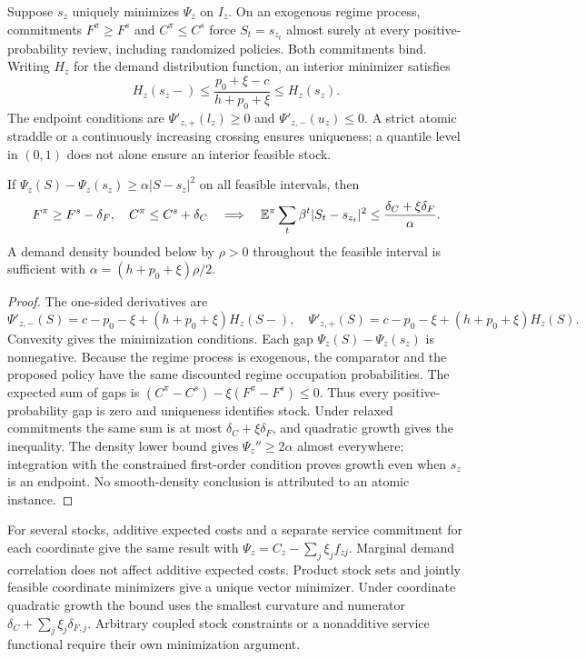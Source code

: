 \documentclass[11pt,letterpaper]{article}
\theoremstyle{definition}\newtheorem{remark}[theorem]{Remark}
\begin{document}
\begin{proposition}\label{ecprop:stock}
Suppose $s_z$ uniquely minimizes $\Psi_z$ on $I_z$. On an exogenous regime process, commitments $F^\pi\geq F^s$ and $C^\pi\leq C^s$ force $S_t=s_{z_t}$ almost surely at every positive-probability review, including randomized policies. Both commitments bind. Writing $H_z$ for the demand distribution function, an interior minimizer satisfies
\[
 H_z(s_z-)\leq\frac{p_0+\xi-c}{h+p_0+\xi}\leq H_z(s_z).
\]
The endpoint conditions are $\Psi'_{z,+}(l_z)\geq0$ and $\Psi'_{z,-}(u_z)\leq0$. A strict atomic straddle or a continuously increasing crossing ensures uniqueness; a quantile level in $(0,1)$ does not alone ensure an interior feasible stock.

If $\Psi_z(S)-\Psi_z(s_z)\geq\alpha|S-s_z|^2$ on all feasible intervals, then
\[
 F^\pi\geq F^s-\delta_F,\quad C^\pi\leq C^s+\delta_C
 \quad\Longrightarrow\quad
 \mathbb E^\pi\sum_t\beta^t|S_t-s_{z_t}|^2\leq\frac{\delta_C+\xi\delta_F}{\alpha}.
\]
A demand density bounded below by $\rho>0$ throughout the feasible interval is sufficient with $\alpha=(h+p_0+\xi)\rho/2$.
\end{proposition}
\begin{proof}
The one-sided derivatives are
\[
 \Psi'_{z,-}(S)=c-p_0-\xi+(h+p_0+\xi)H_z(S-),\quad
 \Psi'_{z,+}(S)=c-p_0-\xi+(h+p_0+\xi)H_z(S).
\]
Convexity gives the minimization conditions. Each gap $\Psi_z(S)-\Psi_z(s_z)$ is nonnegative. Because the regime process is exogenous, the comparator and the proposed policy have the same discounted regime occupation probabilities. The expected sum of gaps is
$(C^\pi-C^s)-\xi(F^\pi-F^s)\leq0$. Thus every positive-probability gap is zero and uniqueness identifies stock. Under relaxed commitments the same sum is at most $\delta_C+\xi\delta_F$, and quadratic growth gives the inequality. The density lower bound gives $\Psi_z''\geq2\alpha$ almost everywhere; integration with the constrained first-order condition proves growth even when $s_z$ is an endpoint. No smooth-density conclusion is attributed to an atomic instance.\end{proof}

For several stocks, additive expected costs and a separate service commitment for each coordinate give the same result with $\Psi_z=C_z-\sum_j\xi_j f_{zj}$. Marginal demand correlation does not affect additive expected costs. Product stock sets and jointly feasible coordinate minimizers give a unique vector minimizer. Under coordinate quadratic growth the bound uses the smallest curvature and numerator $\delta_C+\sum_j\xi_j\delta_{F,j}$. Arbitrary coupled stock constraints or a nonadditive service functional require their own minimization argument.
\end{document}
